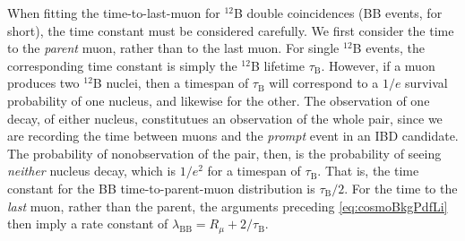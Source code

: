 \documentclass[../thesis.tex]{subfiles}
\begin{document}
When fitting the time-to-last-muon for $^{12}$B double coincidences (BB events, for short), the time constant must be considered carefully. We first consider the time to the \emph{parent} muon, rather than to the last muon. For single $^{12}$B events, the corresponding time constant is simply the $^{12}$B lifetime $\tau_{\mathrm{B}}$.  However, if a muon produces two $^{12}$B nuclei, then a timespan of $\tau_{\mathrm{B}}$ will correspond to a $1/e$ survival probability of one nucleus, and likewise for the other. The observation of one decay, of either nucleus, constitutues an observation of the whole pair, since we are recording the time between muons and the \emph{prompt} event in an IBD candidate. The probability of nonobservation of the pair, then, is the probability of seeing \emph{neither} nucleus decay, which is $1/e^2$ for a timespan of $\tau_{\mathrm{B}}$. That is, the time constant for the BB time-to-parent-muon distribution is $\tau_{\mathrm{B}}/2$. For the time to the \emph{last} muon, rather than the parent, the arguments preceding \autoref{eq:cosmoBkgPdfLi} then imply a rate constant of $\lambda_{\mathrm{BB}} = R_\mu + 2/\tau_{\mathrm{B}}$.
\begin{comment}
\footnote{We neglect the possibility of only seeing \emph{one} of the nuclei decay, since the IBD coincidence cut of \us{200} is far shorter than the $^{12}$B lifetime of 29~ms, and therefore, the observation of one decay effectively \emph{implies} the observation of the other.}

 As such, the time constant for BB events is $\tau_{\mathrm{B}}/2$. (I'm not sure I buy this. We are \emph{assuming} that the two decays occur within 200~us of each other, and the probability of seeing them both is basically equivalent to the probability of seeing the first, and the time-to-last-muon PDF for the first just has the time constant of $\tau$. Where the time constant \emph{does} get halved is if we consider a muon that produces two nuclei and we want the probability of seeing none i.e. the time to the next decay.)
\end{comment}

\begin{comment}
  XXX our code has the 12B half-life (20 ms) listed as the lifetime (should be 29 ms). This further exacerbates the use of the mistaken(???) factor of 2??? In total our time constant has been off by a factor of 3 (well, plus the Rmu part)
\end{comment}
\end{document}

